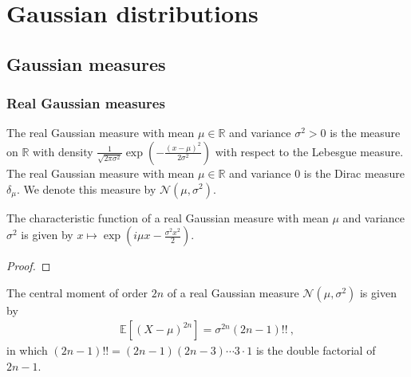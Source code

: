 \chapter{Gaussian distributions}
\label{chap:gaussian}

\section{Gaussian measures}
\label{sec:gaussian_measures}

\subsection{Real Gaussian measures}

\begin{definition}\label{def:gaussianReal}
  \mathlibok
  The real Gaussian measure with mean $\mu \in \mathbb{R}$ and variance $\sigma^2 > 0$ is the measure on $\mathbb{R}$ with density $\frac{1}{\sqrt{2 \pi \sigma^2}} \exp\left(-\frac{(x - \mu)^2}{2 \sigma^2}\right)$ with respect to the Lebesgue measure.
  The real Gaussian measure with mean $\mu \in \mathbb{R}$ and variance $0$ is the Dirac measure $\delta_\mu$.
  We denote this measure by $\mathcal{N}(\mu, \sigma^2)$.
\end{definition}


\begin{lemma}\label{lem:charFun_gaussianReal}
  \mathlibok
The characteristic function of a real Gaussian measure with mean $\mu$ and variance $\sigma^2$ is given by
$x \mapsto \exp\left(i \mu x - \frac{\sigma^2 x^2}{2}\right)$.
\end{lemma}

\begin{proof}\leanok

\end{proof}


\begin{lemma}\label{lem:centralMoment_two_mul_gaussianReal}
  \leanok
The central moment of order $2n$ of a real Gaussian measure $\mathcal{N}(\mu, \sigma^2)$ is given by
\begin{align*}
  \mathbb{E}[(X - \mu)^{2n}] = \sigma^{2n} (2n - 1)!! \: ,
\end{align*}
in which $(2n - 1)!! = (2n - 1)(2n - 3) \cdots 3 \cdot 1$ is the double factorial of $2n - 1$.
\end{lemma}

